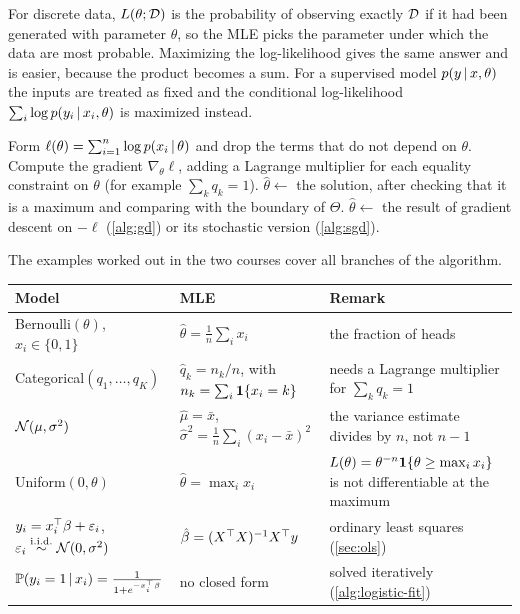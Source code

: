 For discrete data, $L(\theta;\mathcal{D})$ is the probability of observing exactly $\mathcal{D}$ if it had been generated with parameter $\theta$, so the MLE picks the parameter under which the data are most probable. Maximizing the log-likelihood gives the same answer and is easier, because the product becomes a sum. For a supervised model $p(y\,|\, x,\theta)$ the inputs are treated as fixed and the conditional log-likelihood $\sum_i\log p(y_i\,|\, x_i,\theta)$ is maximized instead.

\begin{algorithm}[H]
\caption{Maximum Likelihood Estimation}\label{alg:mle}
\begin{algorithmic}[1]
\State Form $\ell(\theta)=\sum_{i=1}^n\log p(x_i\,|\,\theta)$ and drop the terms that do not depend on $\theta$.
\State Compute the gradient $\nabla_\theta\ell$, adding a Lagrange multiplier for each equality constraint on $\theta$ (for example $\sum_kq_k=1$).
  \State $\hat\theta\gets$ the solution, after checking that it is a maximum and comparing with the boundary of $\Theta$.
\Else
  \State $\hat\theta\gets$ the result of gradient descent on $-\ell$ (\cref{alg:gd}) or its stochastic version (\cref{alg:sgd}).
\EndIf
{}
\end{algorithmic}
\end{algorithm}

The examples worked out in the two courses cover all branches of the algorithm.

\begin{center}
\small
\begin{tabularx}{\textwidth}{@{}l>{\raggedright\arraybackslash}X>{\raggedright\arraybackslash}X@{}}
\toprule
Model & MLE & Remark \\
\midrule
Bernoulli$(\theta)$, $x_i\in\{0,1\}$ & $\hat\theta=\frac1n\sum_ix_i$ & the fraction of heads \\
Categorical$(q_1,\dots,q_K)$ & $\hat q_k=n_k/n$, with $n_k=\sum_i\mathbf{1}\{x_i=k\}$ & needs a Lagrange multiplier for $\sum_kq_k=1$ \\
$\mathcal{N}(\mu,\sigma^2)$ & $\hat\mu=\bar x$, $\hat\sigma^2=\frac1n\sum_i(x_i-\bar x)^2$ & the variance estimate divides by $n$, not $n-1$ \\
Uniform$(0,\theta)$ & $\hat\theta=\max_ix_i$ & $L(\theta)=\theta^{-n}\mathbf{1}\{\theta\ge\max_ix_i\}$ is not differentiable at the maximum \\
$y_i=x_i^{\top}\beta+\varepsilon_i$, $\varepsilon_i\stackrel{\mathrm{i.i.d.}}{\sim}\mathcal{N}(0,\sigma^2)$ & $\hat\beta=(X^{\top} X)^{-1}X^{\top} y$ & ordinary least squares (\cref{sec:ols}) \\
$\mathbb{P}(y_i=1\,|\, x_i)=\frac{1}{1+e^{-x_i^{\top}\beta}}$ & no closed form & solved iteratively (\cref{alg:logistic-fit}) \\
\bottomrule
\end{tabularx}
\end{center}

